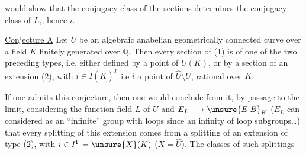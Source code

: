 would show that the conjugacy class of the sections determines the conjugacy class of $L_i$, hence $i$.

\uline{Conjecture A} Let $U$ be an algebraic anabelian geometrically connected curve over a field $K$ finitely generated over $\mathbb{Q}$. Then every section of (1) is  of one of the two preceding types, i.e. either defined by a point of $U(K)$, or by a section of an extension (2), with $i\in I(\bar K)^\Gamma$ i.e $i$ a point of $\widehat U\setminus U$, rational over $K$.

If one admits this conjecture, then one would conclude from it, by passage to the limit, considering the function field $L$ of $U$ and $E_L\longrightarrow \unsure{E|B}_K$ ($E_L$ can  considered as an ``infinite'' group with loops since an infinity of  loop subgroups\ldots) that every splitting of this extension comes from a splitting of an extension of type (2), with $i\in I^\Gamma=\unsure{X}(K)$ ($X=\widehat U$). The  classes of such splittings
